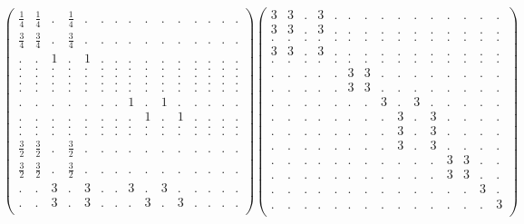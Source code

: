 \documentclass[12pt,a4paper]{amsart}
\begin{document}
\begin{align*}
\left(\begin{array}{rrrrrrrrrrrrrrr}%
\frac14&\frac14&.&\frac14&.&.&.&.&.&.&.&.&.&.&.\\%
\frac34&\frac34&.&\frac34&.&.&.&.&.&.&.&.&.&.&.\\%
.&.&1&.&1&.&.&.&.&.&.&.&.&.&.\\%
.&.&.&.&.&.&.&.&.&.&.&.&.&.&.\\%
.&.&.&.&.&.&.&.&.&.&.&.&.&.&.\\%
.&.&.&.&.&.&.&.&.&.&.&.&.&.&.\\%
.&.&.&.&.&.&.&.&.&.&.&.&.&.&.\\%
.&.&.&.&.&.&.&1&.&1&.&.&.&.&.\\%
.&.&.&.&.&.&.&.&1&.&1&.&.&.&.\\%
.&.&.&.&.&.&.&.&.&.&.&.&.&.&.\\%
.&.&.&.&.&.&.&.&.&.&.&.&.&.&.\\%
\frac32&\frac32&.&\frac32&.&.&.&.&.&.&.&.&.&.&.\\%
\frac32&\frac32&.&\frac32&.&.&.&.&.&.&.&.&.&.&.\\%
.&.&3&.&3&.&.&3&.&3&.&.&.&.&.\\%
.&.&3&.&3&.&.&.&3&.&3&.&.&.&.\\%
\end{array}\right)%
\left(\begin{array}{rrrrrrrrrrrrrrr}%
3&3&.&3&.&.&.&.&.&.&.&.&.&.&.\\%
3&3&.&3&.&.&.&.&.&.&.&.&.&.&.\\%
.&.&.&.&.&.&.&.&.&.&.&.&.&.&.\\%
3&3&.&3&.&.&.&.&.&.&.&.&.&.&.\\%
.&.&.&.&.&.&.&.&.&.&.&.&.&.&.\\%
.&.&.&.&.&3&3&.&.&.&.&.&.&.&.\\%
.&.&.&.&.&3&3&.&.&.&.&.&.&.&.\\%
.&.&.&.&.&.&.&3&.&3&.&.&.&.&.\\%
.&.&.&.&.&.&.&.&3&.&3&.&.&.&.\\%
.&.&.&.&.&.&.&.&3&.&3&.&.&.&.\\%
.&.&.&.&.&.&.&.&3&.&3&.&.&.&.\\%
.&.&.&.&.&.&.&.&.&.&.&3&3&.&.\\%
.&.&.&.&.&.&.&.&.&.&.&3&3&.&.\\%
.&.&.&.&.&.&.&.&.&.&.&.&.&3&.\\%
.&.&.&.&.&.&.&.&.&.&.&.&.&.&3\\%
\end{array}\right)%
\end{align*}
\end{document}
